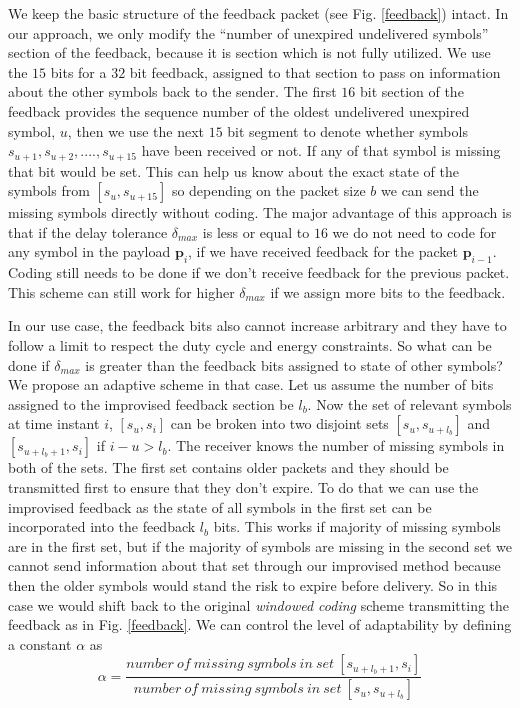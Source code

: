 We keep the basic structure of the feedback packet (see Fig. \ref{feedback}) intact. In our approach, we only modify the ``number of unexpired undelivered symbols'' section of the feedback, because it is section which is not fully utilized. We use the $15$ bits for a $32$ bit feedback, assigned to that section to pass on information about the other symbols back to the sender. The first $16$ bit section of the feedback provides the sequence number of the oldest undelivered unexpired symbol, $u$,  then we use the next $15$ bit segment to denote whether symbols $s_{u+1}, s_{u+2},...., s_{u+15}$ have been received or not. If any of that symbol is missing that bit would be set. This can help us know about the exact state of the symbols from $[s_u, s_{u+15}]$ so depending on the packet size $b$ we can send the missing symbols directly without coding. The major advantage of this approach is that if the delay tolerance $\delta_{max}$ is less or equal to $16$ we do not need to code for any symbol in the payload $\mathbf{p}_i$, if we have received feedback for the packet $\mathbf{p}_{i-1}$. Coding still needs to be done if we don't receive feedback for the previous packet. This scheme can still work for higher $\delta_{max}$ if we assign more bits to the feedback.

In our use case, the feedback bits also cannot increase arbitrary and they have to follow a limit to respect the duty cycle and energy constraints. So what can be done if $\delta_{max}$ is greater than the feedback bits assigned to state of other symbols? We propose an adaptive scheme in that case. Let us assume the number of bits assigned to the improvised feedback section be $l_b$. Now the set of relevant symbols at time instant $i$, $[s_{u}, s_i]$ can be broken into two disjoint sets $[s_{u}, s_{u+l_b}]$ and $[s_{u+l_b+1}, s_{i}]$ if $i-u > l_b$. The receiver knows the number of missing symbols in both of the sets. The first set contains older packets and they should be transmitted first to ensure that they don't expire. To do that we can use the improvised feedback as the state of all symbols in the first set can be incorporated into the feedback $l_b$ bits. This works if majority of missing symbols are in the first set, but if the majority of symbols are missing in the second set we cannot send information about that set through our improvised method because then the older symbols would stand the risk to expire before delivery. So in this case we would shift back to the original \textit{windowed coding} scheme transmitting the feedback as in Fig. \ref{feedback}. We can control the level of adaptability by defining a constant $\alpha$ as
\begin{equation}
	\alpha = \frac{number\ of\ missing\ symbols\ in\ set\ [s_{u+l_b+1}, s_i]}{number\ of\ missing\ symbols\ in\ set\ [s_{u}, s_{u+l_b}]}
\end{equation}

